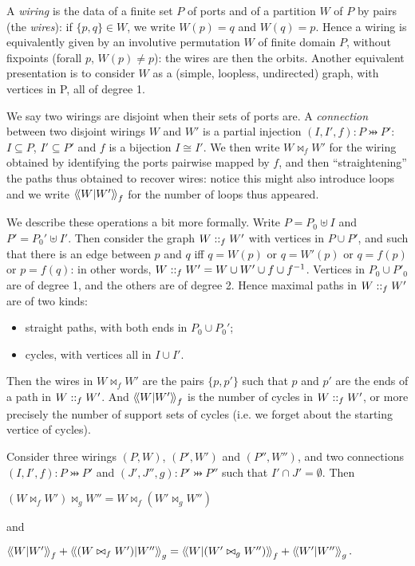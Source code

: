 A \emph{wiring} is the data of a finite set \(P\) of ports and of a
partition \({W}\) of \(P\) by pairs (the \emph{wires}): if
\(\{p,q\}\in{W}\), we write \({W}(p)=q\) and \({W}(q)=p\). Hence a
wiring is equivalently given by an involutive permutation \({W}\) of
finite domain \(P\), without fixpoints (forall \(p\), \({W}(p)\not=p\)):
the wires are then the orbits. Another equivalent presentation is to
consider \({W}\) as a (simple, loopless, undirected) graph, with
vertices in P, all of degree 1.

We say two wirings are disjoint when their sets of ports are. A
\emph{connection} between two disjoint wirings \(W\) and \(W'\) is a
partial injection \((I,I',f):P\pinj P'\): \(I\subseteq P\),
\(I'\subseteq P'\) and \(f\) is a bijection \(I\cong I'\). We then write
\(W\bowtie_f{{W}'}\) for the wiring obtained by identifying the ports
pairwise mapped by \(f\), and then ``straightening'' the paths thus
obtained to recover wires: notice this might also introduce loops and we
write \(\left\langle\!\left\langle W\middle|W'\right\rangle\!\right\rangle_f\) for the number of loops thus appeared.

We describe these operations a bit more formally. Write
\(P = P_0\uplus I\) and \(P' = P_0'\uplus I'\). Then consider the graph
\(W\mathrel{::}_f{{W}'}\) with vertices in \(P\cup P'\), and such that
there is an edge between \(p\) and \(q\) iff \(q={W}(p)\) or
\(q={W'}(p)\) or \(q=f(p)\) or \(p=f(q)\): in other words,
\(W\mathrel{::}_f{{W}'}=W\cup W'\cup f\cup f^{-1}\). Vertices in
\(P_0\cup P'_0\) are of degree 1, and the others are of degree 2. Hence
maximal paths in \(W\mathrel{::}_f{{W}'}\) are of two kinds:
\begin{itemize}
\item straight paths, with both ends in \(P_0\cup P_0'\);
\item cycles, with vertices all in \(I\cup I'\).
\end{itemize}
Then the wires in \(W\bowtie_f{{W}'}\) are the pairs \(\{p,p'\}\) such
that \(p\) and \(p'\) are the ends of a path in \(W\mathrel{::}_f{{W}'}\).
And \(\left\langle\!\left\langle W\middle|W'\right\rangle\!\right\rangle_{f}\) is the number of cycles in
\(W\mathrel{::}_f{{W}'}\), or more precisely the number of support sets of
cycles (i.e. we forget about the starting vertice of cycles).

\begin{lemma}
Consider three wirings \((P,W)\), \((P',W')\) and
\((P'',W'')\), and two connections \((I,I',f):P\pinj P'\) and
\((J',J'',g):P'\pinj P''\) such that \(I'\cap J'=\emptyset\). Then

\((W\bowtie_f W')\bowtie_g W''=
  W\bowtie_f(W'\bowtie_g W'')\)

and

\(\Inner{W}{W'}_{f}+\Inner{(W\bowtie_f{{W}'})}{{W}''}_g=
    \Inner{W}{(W'\bowtie_g W'')}_f+\Inner{{W}'}{{W}''}_g.\)
\end{lemma}
  
